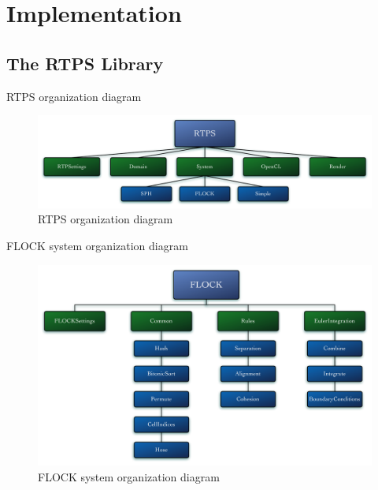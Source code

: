 \documentclass[red]{beamer}
\begin{document}
\section{Implementation}

\subsection{The RTPS Library}

\begin{frame}{RTPS organization diagram}
	\begin{figure}[htbp]
	\begin{center}
	\includegraphics[scale=0.25]{../figures/RTPSdiagramMyrna.pdf}
	\caption{RTPS organization diagram}
	\end{center}
	\end{figure}
\end{frame}

\begin{frame}{FLOCK system organization diagram}
	\begin{figure}[htbp]
	\begin{center}
	\includegraphics[scale=0.25]{../figures/FLOCKdiagramMyrna.pdf}
	\caption{FLOCK system organization diagram}
	\end{center}
	\end{figure}
\end{frame}
\end{document}
